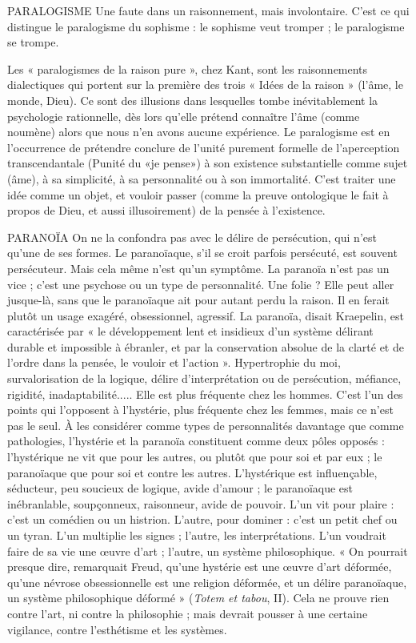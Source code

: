 PARALOGISME Une faute dans un raisonnement, mais involontaire. C’est
ce qui distingue le paralogisme du sophisme : le sophisme
veut tromper ; le paralogisme se trompe.

Les « paralogismes de la raison pure », chez Kant, sont les raisonnements
dialectiques qui portent sur la première des trois « Idées de la raison » (l’âme, le
monde, Dieu). Ce sont des illusions dans lesquelles tombe inévitablement la
psychologie rationnelle, dès lors qu’elle prétend connaître l’âme (comme noumène)
alors que nous n’en avons aucune expérience. Le paralogisme est en
l'occurrence de prétendre conclure de l’unité purement formelle de l’aperception
transcendantale (Punité du «je pense») à son existence substantielle
comme sujet (âme), à sa simplicité, à sa personnalité ou à son immortalité.
C’est traiter une idée comme un objet, et vouloir passer (comme la preuve
ontologique le fait à propos de Dieu, et aussi illusoirement) de la pensée à
l'existence.

PARANOÏA On ne la confondra pas avec le délire de persécution, qui n’est
qu’une de ses formes. Le paranoïaque, s’il se croit parfois persécuté,
est souvent persécuteur. Mais cela même n’est qu’un symptôme. La paranoïa
n'est pas un vice ; c’est une psychose ou un type de personnalité. Une
folie ? Elle peut aller jusque-là, sans que le paranoïaque ait pour autant perdu
la raison. Il en ferait plutôt un usage exagéré, obsessionnel, agressif. La paranoïa,
disait Kraepelin, est caractérisée par « le développement lent et insidieux
d’un système délirant durable et impossible à ébranler, et par la conservation
absolue de la clarté et de l’ordre dans la pensée, le vouloir et l’action ». Hypertrophie
du moi, survalorisation de la logique, délire d’interprétation ou de persécution,
méfiance, rigidité, inadaptabilité..... Elle est plus fréquente chez les
hommes. C’est l’un des points qui l’opposent à l’hystérie, plus fréquente chez
les femmes, mais ce n’est pas le seul. À les considérer comme types de personnalités
davantage que comme pathologies, l’hystérie et la paranoïa constituent
comme deux pôles opposés : l’hystérique ne vit que pour les autres, ou plutôt
que pour soi et par eux ; le paranoïaque que pour soi et contre les autres. L’hystérique
est influençable, séducteur, peu soucieux de logique, avide d’amour ; le
paranoïaque est inébranlable, soupçonneux, raisonneur, avide de pouvoir. L’un
vit pour plaire : c’est un comédien ou un histrion. L'autre, pour dominer : c’est
un petit chef ou un tyran. L’un multiplie les signes ; l’autre, les interprétations.
L’un voudrait faire de sa vie une œuvre d’art ; l’autre, un système philosophique.
« On pourrait presque dire, remarquait Freud, qu’une hystérie est une
œuvre d’art déformée, qu’une névrose obsessionnelle est une religion déformée, et
un délire paranoïaque, un système philosophique déformé » ({\it Totem et tabou}, II).
Cela ne prouve rien contre l’art, ni contre la philosophie ; mais devrait pousser
à une certaine vigilance, contre l’esthétisme et les systèmes.

